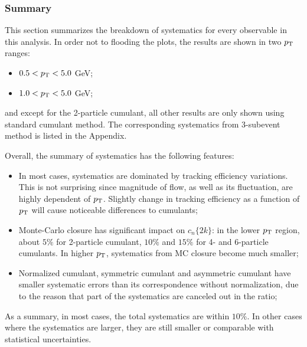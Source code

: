 \subsubsection{Summary}

This section summarizes the breakdown of systematics for every observable in this analysis. In order not to flooding the plots, the results are shown in two $p_\text{T}$ ranges:
\begin{itemize}
\item $0.5<p_\text{T}<5.0$ GeV;
\item $1.0<p_\text{T}<5.0$ GeV;
\end{itemize}
and except for the 2-particle cumulant, all other results are only shown using standard cumulant method. The corresponding systematics from 3-subevent method is listed in the Appendix.

Overall, the summary of systematics has the following features:
\begin{itemize}
\item In most cases, systematics are dominated by tracking efficiency variations. This is not surprising since magnitude of flow, as well as its fluctuation, are highly dependent of $p_\text{T}$. Slightly change in tracking efficiency as a function of $p_\text{T}$ will cause noticeable differences to cumulants;
\item Monte-Carlo closure has significant impact on $c_n\{2k\}$: in the lower $p_\text{T}$ region, about $5\%$ for 2-particle cumulant, $10\%$ and $15\%$ for 4- and 6-particle cumulants. In higher $p_\text{T}$, systematics from MC closure become much smaller;
\item Normalized cumulant, symmetric cumulant and asymmetric cumulant have smaller systematic errors than its correspondence without normalization, due to the reason that part of the systematics are canceled out in the ratio;
\end{itemize}

As a summary, in most cases, the total systematics are within $10\%$. In other cases where the systematics are larger, they are still smaller or comparable with statistical uncertainties.

